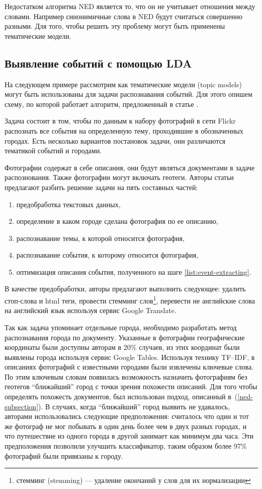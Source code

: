\documentclass[12pt, a4paper]{article}
\begin{document}
	Недостатком алгоритма NED является то, что он не учитывает отношения между словами. Например синонимичные слова в NED будут считаться совершенно разными. Для того, чтобы решить эту проблему могут быть применены тематические модели.
	
	\subsection{Выявление событий с помощью LDA}
	\label{lda-subsection}
  На следующем примере рассмотрим как тематические модели (topic models) могут быть использованы для задачи распознавания событий. Для этого опишем схему, по которой работает алгоритм, предложенный в статье  \cite{mediaeval}. 
  
  Задача состоит в том, чтобы по данным к набору фотографий в сети Flickr распознать все события на определенную тему, проходившие в обозначенных городах. Есть несколько вариантов постановок задачи, они различаются тематикой событий и городами. 
  
  Фотографии содержат в себе описания, они будут являться документами в задаче распознования. Также фотографии могут включать геотеги. Авторы статьи предлагают разбить решение задачи на пять составных частей: 
  \begin{enumerate}
  \item предобработка текстовых данных,
  \item определение в каком городе сделана фотография по ее описанию,
  \item распознавание темы, к которой относится фотография,
  \item распознавание события, к которому относится фотография, \label{list:event-extracting}
  \item оптимизация описания события, полученного на шаге \ref{list:event-extracting}.
  \end{enumerate}
  
  В качестве предобработки, авторы предлагают выполнить следующее: удалить стоп-слова и html теги, провести стемминг слов\footnote{стемминг (stemming) --- удаление окончаний у слов для их нормализации}, перевести не английские слова на английский язык используя сервис Google Translate.
  
	Так как задача упоминает отдельные города, необходимо разработать метод распознавания города по документу. Указанные в фотографии географические координаты были доступны авторам в 20\% случаев, из этих координат были выявлены города используя сервис Google Tables. Используя технику TF--IDF, в описаниях фотографий с известными городами были извлечены ключевые слова. По этим ключевым словам появилась возможность назначить фотографиям без геотегов ``ближайший'' город с точки зрения похожести описаний. Для того чтобы определять похожесть документов, был использован подход, описанный в~(\ref{ned-subsection}). В случаях, когда ``ближайший'' город выявить не удавалось, авторами использовались следующие предположения: считалось что один и тот же фотограф не мог побывать в один день более чем в двух разных городах, и что путешествие из одного города в другой занимает как минимум два часа. Эти предположения позволили улучшить классификатор, таким образом более 97\% фотографий были привязаны к городу.
	
\end{document}
